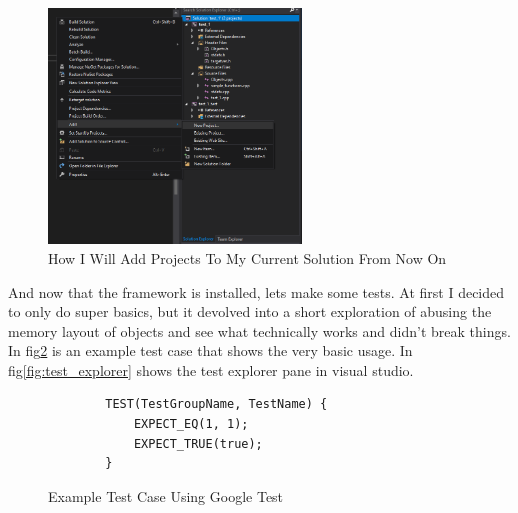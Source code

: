 \documentclass[12pt]{article}
\begin{document}
\begin{figure}[ht]
	\centering
	\includegraphics[width=0.6\textwidth]{vs_new_project.png}
	\caption{How I Will Add Projects To My Current Solution From Now On}
	\label{fig:vs_new_project}
\end{figure}

And now that the framework is installed, lets make some tests.
At first I decided to only do super basics, but it devolved into a short exploration of abusing the memory layout of objects and see what technically works and didn't break things.
In fig\ref{fig:example_test} is an example test case that shows the very basic usage.
In fig\ref{fig:test_explorer} shows the test explorer pane in visual studio.

\begin{figure}[ht]
	\centering
	\begin{verbatim}
		TEST(TestGroupName, TestName) {
			EXPECT_EQ(1, 1);
			EXPECT_TRUE(true);
		}
	\end{verbatim}
	\vspace{-15pt}
	\caption{Example Test Case Using Google Test}
	\label{fig:example_test}
\end{figure}
\end{document}
